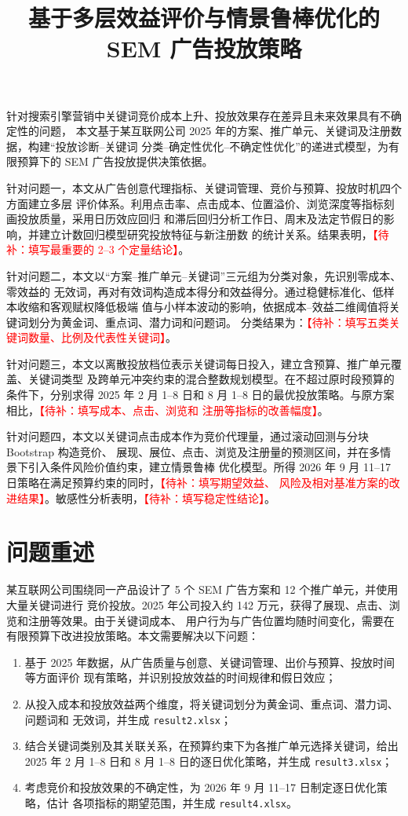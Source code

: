 \documentclass[UTF8,a4paper,zihao=-4]{ctexart}
\title{基于多层效益评价与情景鲁棒优化的 SEM 广告投放策略}
\newcommand{\placeholder}[1]{\textcolor{red}{【待补：#1】}}
\begin{document}
\begin{mcmabstract}
  针对搜索引擎营销中关键词竞价成本上升、投放效果存在差异且未来效果具有不确定性的问题，
  本文基于某互联网公司 2025 年的方案、推广单元、关键词及注册数据，构建“投放诊断--关键词
  分类--确定性优化--不确定性优化”的递进式模型，为有限预算下的 SEM 广告投放提供决策依据。

  针对问题一，本文从广告创意代理指标、关键词管理、竞价与预算、投放时机四个方面建立多层
  评价体系。利用点击率、点击成本、位置溢价、浏览深度等指标刻画投放质量，采用日历效应回归
  和滞后回归分析工作日、周末及法定节假日的影响，并建立计数回归模型研究投放特征与新注册数
  的统计关系。结果表明，\placeholder{填写最重要的 2--3 个定量结论}。

  针对问题二，本文以“方案--推广单元--关键词”三元组为分类对象，先识别零成本、零效益的
  无效词，再对有效词构造成本得分和效益得分。通过稳健标准化、低样本收缩和客观赋权降低极端
  值与小样本波动的影响，依据成本--效益二维阈值将关键词划分为黄金词、重点词、潜力词和问题词。
  分类结果为：\placeholder{填写五类关键词数量、比例及代表性关键词}。

  针对问题三，本文以离散投放档位表示关键词每日投入，建立含预算、推广单元覆盖、关键词类型
  及跨单元冲突约束的混合整数规划模型。在不超过原时段预算的条件下，分别求得 2025 年 2 月
  1--8 日和 8 月 1--8 日的最优投放策略。与原方案相比，\placeholder{填写成本、点击、浏览和
  注册等指标的改善幅度}。

  针对问题四，本文以关键词点击成本作为竞价代理量，通过滚动回测与分块 Bootstrap 构造竞价、
  展现、展位、点击、浏览及注册量的预测区间，并在多情景下引入条件风险价值约束，建立情景鲁棒
  优化模型。所得 2026 年 9 月 11--17 日策略在满足预算约束的同时，\placeholder{填写期望效益、
  风险及相对基准方案的改进结果}。敏感性分析表明，\placeholder{填写稳定性结论}。
\end{mcmabstract}

\clearpage

\section{问题重述}

某互联网公司围绕同一产品设计了 5 个 SEM 广告方案和 12 个推广单元，并使用大量关键词进行
竞价投放。2025 年公司投入约 142 万元，获得了展现、点击、浏览和注册等效果。由于关键词成本、
用户行为与广告位置均随时间变化，需要在有限预算下改进投放策略。本文需要解决以下问题：

\begin{enumerate}
  \item 基于 2025 年数据，从广告质量与创意、关键词管理、出价与预算、投放时间等方面评价
  现有策略，并识别投放效益的时间规律和假日效应；
  \item 从投入成本和投放效益两个维度，将关键词划分为黄金词、重点词、潜力词、问题词和
  无效词，并生成 \texttt{result2.xlsx}；
  \item 结合关键词类别及其关联关系，在预算约束下为各推广单元选择关键词，给出 2025 年
  2 月 1--8 日和 8 月 1--8 日的逐日优化策略，并生成 \texttt{result3.xlsx}；
  \item 考虑竞价和投放效果的不确定性，为 2026 年 9 月 11--17 日制定逐日优化策略，估计
  各项指标的期望范围，并生成 \texttt{result4.xlsx}。
\end{enumerate}
\end{document}
